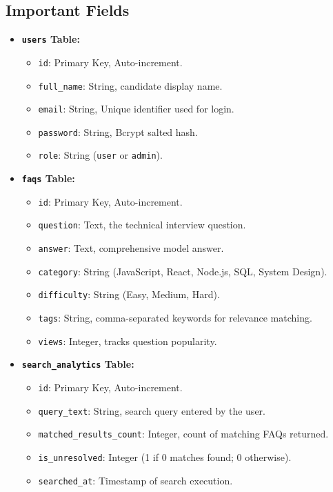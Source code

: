 \subsection{Important Fields}
\begin{itemize}
    \item \textbf{\texttt{users} Table:}
    \begin{itemize}
        \item \texttt{id}: Primary Key, Auto-increment.
        \item \texttt{full\_name}: String, candidate display name.
        \item \texttt{email}: String, Unique identifier used for login.
        \item \texttt{password}: String, Bcrypt salted hash.
        \item \texttt{role}: String (\texttt{user} or \texttt{admin}).
    \end{itemize}
    \item \textbf{\texttt{faqs} Table:}
    \begin{itemize}
        \item \texttt{id}: Primary Key, Auto-increment.
        \item \texttt{question}: Text, the technical interview question.
        \item \texttt{answer}: Text, comprehensive model answer.
        \item \texttt{category}: String (JavaScript, React, Node.js, SQL, System Design).
        \item \texttt{difficulty}: String (Easy, Medium, Hard).
        \item \texttt{tags}: String, comma-separated keywords for relevance matching.
        \item \texttt{views}: Integer, tracks question popularity.
    \end{itemize}
    \item \textbf{\texttt{search\_analytics} Table:}
    \begin{itemize}
        \item \texttt{id}: Primary Key, Auto-increment.
        \item \texttt{query\_text}: String, search query entered by the user.
        \item \texttt{matched\_results\_count}: Integer, count of matching FAQs returned.
        \item \texttt{is\_unresolved}: Integer (1 if 0 matches found; 0 otherwise).
        \item \texttt{searched\_at}: Timestamp of search execution.
    \end{itemize}
\end{itemize}

